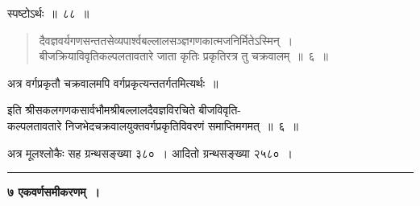 \documentclass[11pt, openany]{book}
\begin{document}
\indent स्पष्टोऽर्थः~॥~८८~॥

\begin{quote}
{\qt दैवज्ञवर्यगणसन्ततसेव्यपार्श्वबल्लालसञ्ज्ञगणकात्मजनिर्मितेऽस्मिन्~। \\
बीजक्रियाविवृतिकल्पलतावतारे जाता कृतिः प्रकृतिरत्र तु चक्रवालम्~॥~६~॥}
\end{quote}

अत्र वर्गप्रकृतौ चक्रवालमपि वर्गप्रकृत्यन्ततर्गतमित्यर्थः~॥

\begin{center}
इति श्रीसकलगणकसार्वभौमश्रीबल्लालदैवज्ञविरचिते बीजविवृति- \\
कल्पलतावतारे निजभेदचक्रवालयुक्तवर्गप्रकृतिविवरणं समाप्तिमगमत्~॥~६~॥\\
\vspace{2mm}

अत्र मूलश्लोकैः सह ग्रन्थसङ्ख्या ३८०~। आदितो ग्रन्थसङ्ख्या २५८०~।\\
\vspace{1cm}
\rule{0.2\linewidth}{0.5pt}
\end{center}
\newpage
 \label{ch7}
\begin{center}
{\LARGE \textbf{७ एकवर्णसमीकरणम्~।}}
\end{center}
 
\end{document}
